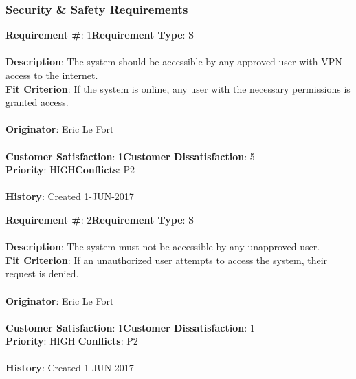 \documentclass[titlepage]{article}
\begin{document}
\subsubsection{Security \& Safety Requirements}
\begin{framed}
	\noindent\textbf{Requirement \#}: 1\hfill \textbf{Requirement Type}: S\hfill\\\\
	\noindent\textbf{Description}: The system should be accessible by any approved user with VPN access to the internet.\\
	\textbf{Fit Criterion}: If the system is online, any user with the necessary permissions is granted access.\\\\
	\textbf{Originator}: Eric Le Fort\\\\
	\noindent\textbf{Customer Satisfaction}: 1\hfill \textbf{Customer Dissatisfaction}: 5\hfill\\
	\textbf{Priority}: HIGH\hfill \textbf{Conflicts}: P2\hfill\\\\
	\noindent\textbf{History}: Created 1-JUN-2017
\end{framed}
\begin{framed}
	\noindent\textbf{Requirement \#}: 2\hfill \textbf{Requirement Type}: S\hfill\\\\
	\noindent\textbf{Description}: The system must not be accessible by any unapproved user.\\
	\textbf{Fit Criterion}: If an unauthorized user attempts to access the system, their request is denied.\\\\
	\textbf{Originator}: Eric Le Fort\\\\
	\noindent\textbf{Customer Satisfaction}: 1\hfill \textbf{Customer Dissatisfaction}: 1\hfill\\
	\textbf{Priority}: HIGH \hfill \textbf{Conflicts}: P2\hfill\\\\
	\noindent\textbf{History}: Created 1-JUN-2017
\end{framed}
\newpage
\end{document}

